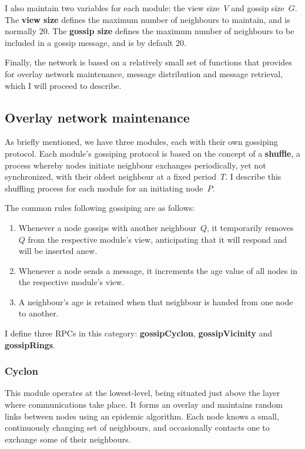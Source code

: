 \documentclass[10pt,a4paper,onecolumn]{article}
\begin{document}
I also maintain two variables for each module: the view size~$V$ and gossip size~$G$. The \textbf{view size} defines the maximum number of neighbours to maintain, and is normally 20. The \textbf{gossip size} defines the maximum number of neighbours to be included in a gossip message, and is by default 20.

Finally, the network is based on a relatively small set of functions that provides for overlay network maintenance, message distribution and message retrieval, which I will proceed to describe.

\subsection{Overlay network maintenance}
As briefly mentioned, we have three modules, each with their own gossiping protocol. Each module's gossiping protocol is based on the concept of a \textbf{shuffle}, a process whereby nodes initiate neighbour exchanges periodically, yet not synchronized, with their oldest neighbour at a fixed period~$T$. I describe this shuffling process for each module for an initiating node~$P$. 

The common rules following gossiping are as follows:
\begin{enumerate}
\item Whenever a node gossips with another neighbour~$Q$, it temporarily removes~$Q$ from the respective module’s view, anticipating that it will respond and will be inserted anew. 
\item Whenever a node sends a message, it increments the age value of all nodes in the respective module's view.
\item A neighbour's age is retained when that neighbour is handed from one node to another.
\end{enumerate}

I define three RPCs in this category: \textbf{gossipCyclon}, \textbf{gossipVicinity} and \textbf{gossipRings}.

\subsubsection{Cyclon}
This module operates at the lowest-level, being situated just above the layer where communications take place. It forms an overlay and maintains random links between nodes using an epidemic algorithm. Each node knows a small, continuously changing set of neighbours, and occasionally contacts one to exchange some of their neighbours.
\end{document}
